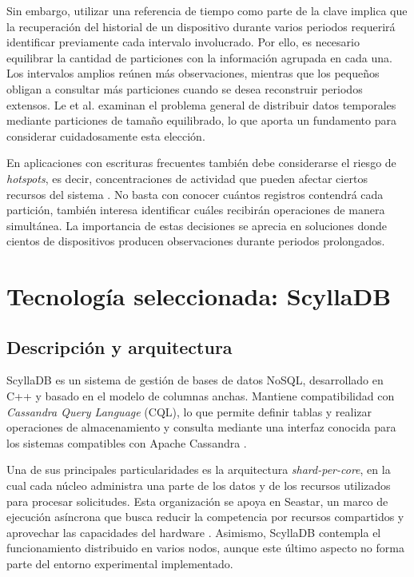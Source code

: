 \documentclass[conference]{IEEEtran}
\begin{document}
Sin embargo, utilizar una referencia de tiempo como parte de la clave implica que la recuperación del historial de un dispositivo durante varios periodos requerirá identificar previamente cada intervalo involucrado. Por ello, es necesario equilibrar la cantidad de particiones con la información agrupada en cada una. Los intervalos amplios reúnen más observaciones, mientras que los pequeños obligan a consultar más particiones cuando se desea reconstruir periodos extensos. Le et al. \cite{le2013} examinan el problema general de distribuir datos temporales mediante particiones de tamaño equilibrado, lo que aporta un fundamento para considerar cuidadosamente esta elección.

En aplicaciones con escrituras frecuentes también debe considerarse el riesgo de \textit{hotspots}, es decir, concentraciones de actividad que pueden afectar ciertos recursos del sistema \cite{kleppmann17}. No basta con conocer cuántos registros contendrá cada partición, también interesa identificar cuáles recibirán operaciones de manera simultánea. La importancia de estas decisiones se aprecia en soluciones donde cientos de dispositivos producen observaciones durante periodos prolongados.

\section{Tecnología seleccionada: ScyllaDB}

\subsection{Descripción y arquitectura}

ScyllaDB es un sistema de gestión de bases de datos NoSQL, desarrollado en C++ y basado en el modelo de columnas anchas. Mantiene compatibilidad con \textit{Cassandra Query Language} (CQL), lo que permite definir tablas y realizar operaciones de almacenamiento y consulta mediante una interfaz conocida para los sistemas compatibles con Apache Cassandra \cite{scylla_arch}.

Una de sus principales particularidades es la arquitectura \textit{shard-per-core}, en la cual cada núcleo administra una parte de los datos y de los recursos utilizados para procesar solicitudes. Esta organización se apoya en Seastar, un marco de ejecución asíncrona que busca reducir la competencia por recursos compartidos y aprovechar las capacidades del hardware \cite{scylla_arch}. Asimismo, ScyllaDB contempla el funcionamiento distribuido en varios nodos, aunque este último aspecto no forma parte del entorno experimental implementado.
\end{document}
